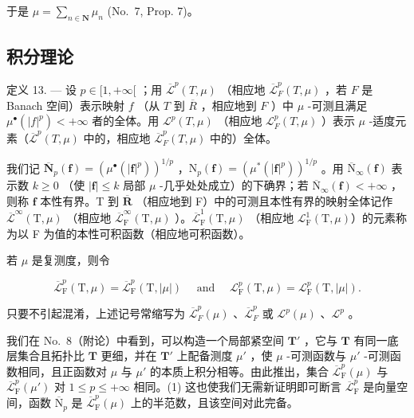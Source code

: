 于是 \(\mu = \sum_{n\in \mathbf{N}}\mu_n\) (No.~7, Prop. 7)。

\subsection{积分理论}

定义 13. --- 设 \(p \in [1, +\infty[\) ；用 \(\overline{\mathcal{L}}^p(T, \mu)\) （相应地 \(\overline{\mathcal{L}}_F^p(T, \mu)\) ，若 \(F\) 是 Banach 空间）表示映射 \(f\) （从 \(T\) 到 \(\overline{R}\) ，相应地到 \(F\) ）中 \(\mu\) -可测且满足 \(\mu^\bullet(|f|^p) < +\infty\) 者的全体。用 \(\mathcal{L}^p(T, \mu)\) （相应地 \(\mathcal{L}_F^p(T, \mu)\) ）表示 \(\mu\) -适度元素（\(\overline{\mathcal{L}}^p(T, \mu)\) 中的，相应地 \(\overline{\mathcal{L}}_F^p(T, \mu)\) 中的）全体。

我们记 \(\overline{\mathbf{N}}_p(\mathbf{f}) = (\mu^\bullet (|\mathbf{f}|^p))^{1 / p}\) ，\(\mathrm{N}_p(\mathbf{f}) = (\mu^* (|\mathbf{f}|^p))^{1 / p}\) 。用 \(\overline{\mathrm{N}}_{\infty}(\mathbf{f})\) 表示数 \(k\geqslant 0\) （使 \(|\mathbf{f}|\leqslant k\) 局部 \(\mu\) -几乎处处成立）的下确界；若 \(\overline{\mathrm{N}}_{\infty}(\mathbf{f}) < + \infty\) ，则称 \(\mathbf{f}\) 本性有界。T 到 \(\overline{\mathbf{R}}\) （相应地到 F）中的可测且本性有界的映射全体记作 \(\overline{\mathcal{L}}^{\infty}(\mathrm{T},\mu)\) （相应地 \(\overline{\mathcal{L}}_{\mathrm{F}}^{\infty}(\mathrm{T},\mu)\) ）。\(\overline{\mathcal{L}}_{\mathrm{F}}^{1}(\mathrm{T},\mu)\) （相应地 \(\mathcal{L}_{\mathrm{F}}^{1}(\mathrm{T},\mu)\)）的元素称为以 F 为值的本性可积函数（相应地可积函数）。

若 \(\mu\) 是复测度，则令

\[
\overline {{{{\mathcal {L}}}}} _ {\mathrm{F}} ^ {p} (\mathrm{T}, \mu) = \overline {{{{\mathcal {L}}}}} _ {\mathrm{F}} ^ {p} (\mathrm{T}, | \mu |) \quad \text { and } \quad \mathcal {L} _ {\mathrm{F}} ^ {p} (\mathrm{T}, \mu) = \mathcal {L} _ {\mathrm{F}} ^ {p} (\mathrm{T}, | \mu |).
\]

只要不引起混淆，上述记号常缩写为 \(\overline{\mathcal{L}}_F^p (\mu)\) 、\(\overline{\mathcal{L}}_F^p\) 或 \(\mathcal{L}^p (\mu)\) 、\(\mathcal{L}^p\) 。

我们在 No.~8（附论）中看到，可以构造一个局部紧空间 \(\mathbf{T}'\) ，它与 \(\mathbf{T}\) 有同一底层集合且拓扑比 \(\mathbf{T}\) 更细，并在 \(\mathbf{T}'\) 上配备测度 \(\mu'\) ，使 \(\mu\) -可测函数与 \(\mu'\) -可测函数相同，且正函数对 \(\mu\) 与 \(\mu'\) 的本质上积分相等。由此推出，集合 \(\overline{\mathcal{L}}_{\mathrm{F}}^{p}(\mu)\) 与 \(\overline{\mathcal{L}}_{\mathrm{F}}^{p}(\mu')\) 对 \(1 \leqslant p \leqslant +\infty\) 相同。(1) 这也使我们无需新证明即可断言 \(\overline{\mathcal{L}}_{\mathrm{F}}^{p}\) 是向量空间，函数 \(\overline{\mathrm{N}}_p\) 是 \(\overline{\mathcal{L}}_{\mathrm{F}}^{p}(\mu)\) 上的半范数，且该空间对此完备。

